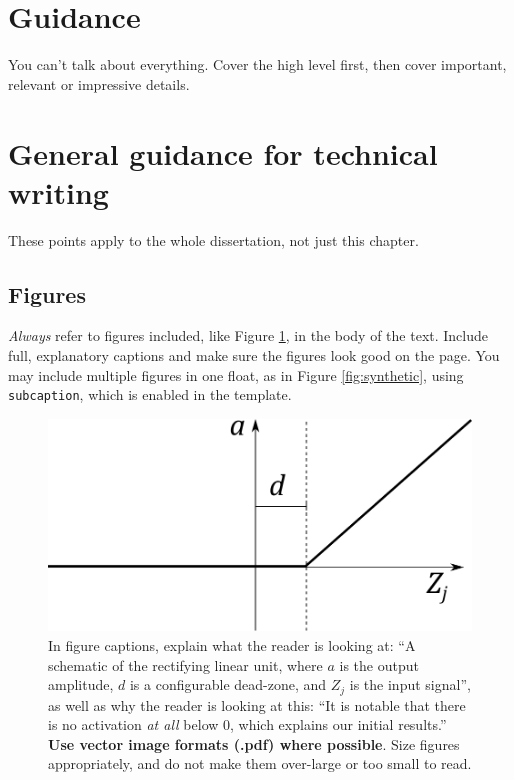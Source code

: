 \documentclass{l4proj}
\begin{document}
{\section{Guidance}
You can't talk about everything. Cover the high level first, then cover important, relevant or impressive details.

\section{General guidance for technical writing}

These points apply to the whole dissertation, not just this chapter.

\subsection{Figures}
\emph{Always} refer to figures included, like Figure \ref{fig:relu}, in the body of the text. Include full, explanatory captions and make sure the figures look good on the page.
You may include multiple figures in one float, as in Figure \ref{fig:synthetic}, using \texttt{subcaption}, which is enabled in the template.


\begin{figure}[htb]
    \centering
    \includegraphics[width=0.5\linewidth]{images/relu.pdf}    

    \caption{In figure captions, explain what the reader is looking at: ``A schematic of the rectifying linear unit, where $a$ is the output amplitude,
    $d$ is a configurable dead-zone, and $Z_j$ is the input signal'', as well as why the reader is looking at this: 
    ``It is notable that there is no activation \emph{at all} below 0, which explains our initial results.'' 
    \textbf{Use vector image formats (.pdf) where possible}. Size figures appropriately, and do not make them over-large or too small to read.
    }

    \label{fig:relu} 
\end{figure}


}
\end{document}
